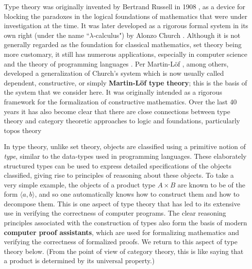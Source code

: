 {Type theory was originally invented by Bertrand Russell in 1908 \cite{Russell:1908}, as a device for blocking the paradoxes in the logical foundations of mathematics  that were under investigation at the time. It was later developed as a rigorous formal system  in its own right (under the name ``$\lambda$-calculus") by Alonzo Church \cite{Church:1933cl,Church:1940tu,Church:1941tc}.  Although it is not generally regarded as the foundation for classical mathematics, set theory being more customary, it still has numerous applications, especially in computer science and the theory of programming languages \cite{Pierce:2002tp}.   Per Martin-L\"{o}f \cite{MartinLof:1998tw,MartinLof:1975tb,MartinLof:1982bn,MartinLof:1984tr}, among others,
developed a generalization of Church's system which is now usually called dependent, constructive, or simply {\bf Martin\--L\"of type theory}; this is the basis of the system that we consider here. It was originally intended as a rigorous framework for the formalization of constructive mathematics.  Over the last 40 years it has also become clear that there are close connections between type theory and category theoretic approaches to logic and foundations, particularly topos theory \cite{elephant}

In type theory, unlike set theory, objects are classified using a primitive notion of \emph{type}, similar to the data-types used in programming languages.  These elaborately structured types can be used to express detailed specifications of the objects classified, giving rise to principles of reasoning about these objects.  To take a very simple example, the objects of a product type $A\times B$ are known to be of the form $\langle a, b\rangle$, and so one automatically knows how to construct them and how to decompose them. This is one aspect of type theory that has led to its extensive use in verifying the correctness of computer programs.  The clear reasoning principles associated with the construction of types also form the basis of modern {\bf computer proof assistants}, which are used for formalizing mathematics and verifying the correctness of formalized proofs.  We return to this aspect of type theory below.  (From the point of view of category theory, this is like saying that a product is determined by its universal property.)


}

